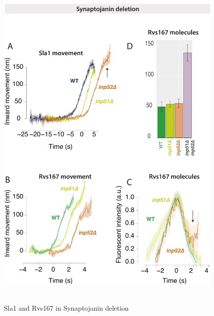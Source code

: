 	\begin{figure}
	\centering
	\includegraphics[width=17cm,height=17cm,keepaspectratio]{figures/results_final/inp_movement}
	\caption{Sla1 and Rvs167 in Synaptojanin deletion \label{fig5}}
	\end{figure}
	
